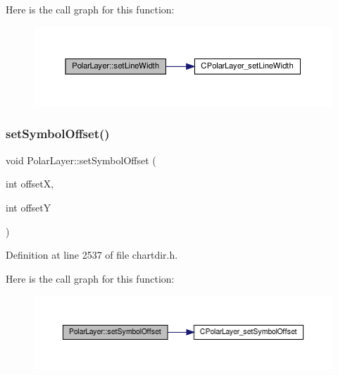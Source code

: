 Here is the call graph for this function\+:
\nopagebreak
\begin{figure}[H]
\begin{center}
\leavevmode
\includegraphics[width=350pt]{class_polar_layer_abfffe32ae3290e562fa3642f8af14ca6_cgraph}
\end{center}
\end{figure}
\mbox{\label{class_polar_layer_aeb69fbf0f85cc7dfb54167adc8f205d3}} 
\subsubsection{\texorpdfstring{set\+Symbol\+Offset()}{setSymbolOffset()}}
{\footnotesize\ttfamily void Polar\+Layer\+::set\+Symbol\+Offset (\begin{DoxyParamCaption}\item[{int}]{offsetX,  }\item[{int}]{offsetY }\end{DoxyParamCaption})\hspace{0.3cm}{\ttfamily [inline]}}



Definition at line 2537 of file chartdir.\+h.

Here is the call graph for this function\+:
\nopagebreak
\begin{figure}[H]
\begin{center}
\leavevmode
\includegraphics[width=350pt]{class_polar_layer_aeb69fbf0f85cc7dfb54167adc8f205d3_cgraph}
\end{center}
\end{figure}
\mbox{\label{class_polar_layer_a5c1c2625aa1860690926f32b181fe72d}} 
